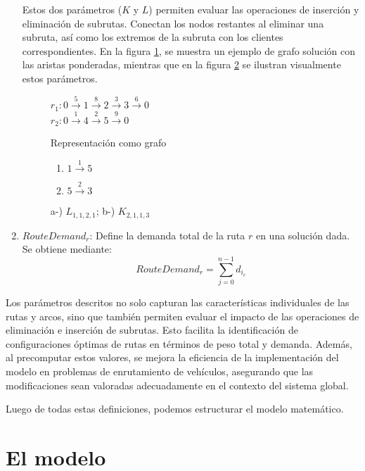 \documentclass{article}
\begin{document}
\begin{enumerate}
Estos dos parámetros ($K$ y $L$) permiten evaluar las operaciones de inserción y eliminación de subrutas. Conectan los nodos restantes al eliminar una subruta, así como los extremos de la subruta con los clientes correspondientes. En la figura \ref{fig:parameter graph}, se muestra un ejemplo de grafo solución con las aristas ponderadas, mientras que en la figura \ref{fig:K-L examples} se ilustran visualmente estos parámetros.

\begin{figure}[h!] \vspace{0.5em} $r_1: 0 \overset{5}{\rightarrow} 1\overset{8}{\rightarrow} 2\overset{3}{\rightarrow} 3\overset{6}{\rightarrow} 0$\\
$r_2: 0\overset{1}{\rightarrow} 4\overset{2}{\rightarrow} 5\overset{9}{\rightarrow} 0$
\caption{Representación como grafo} 
\label{fig:parameter graph} 
\end{figure}

\begin{figure}[h!] 
\vspace{0.5em} 
\begin{enumerate} 
\item $1 \overset{1}{\rightarrow} 5 $ 
\item $5 \overset{2}{\rightarrow} 3 $ 
\end{enumerate} 
\caption{a-) $L_{1,1,2,1}$; b-) $K_{2,1,1,3}$}
 \label{fig:K-L examples} \end{figure}

\item{$RouteDemand_r$: Define la demanda total de la ruta $r$ en una solución dada. Se obtiene mediante:}
\[
RouteDemand_r = \sum\limits_{j=0}^{n-1} d_{i_e}
\] 

\end{enumerate}

Los parámetros descritos no solo capturan las características individuales de las rutas y arcos, sino que también permiten evaluar el impacto de las operaciones de eliminación e inserción de subrutas. Esto facilita la identificación de configuraciones óptimas de rutas en términos de peso total y demanda. Además, al precomputar estos valores, se mejora la eficiencia de la implementación del modelo en problemas de enrutamiento de vehículos, asegurando que las modificaciones sean valoradas adecuadamente en el contexto del sistema global.

Luego de todas estas definiciones, podemos estructurar el modelo matemático.

\section{El modelo}
\end{document}
